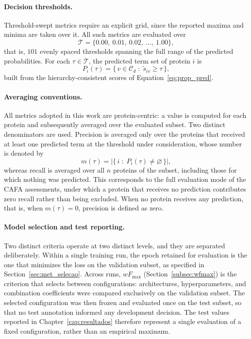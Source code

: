 \documentclass[Ingles]{ic-tese-v3}
\begin{document}
\paragraph{Decision thresholds.}
Threshold-swept metrics require an explicit grid, since the reported maxima and
minima are taken over it. All such metrics are evaluated over
\begin{equation}
\label{eq:limiares}
\mathcal{T} = \{0.00,\ 0.01,\ 0.02,\ \ldots,\ 1.00\},
\end{equation}
\noindent that is, $101$ evenly spaced thresholds spanning the full range of the predicted
probabilities. For each $\tau \in \mathcal{T}$, the predicted term set of protein
$i$ is
\begin{equation}
\label{eq:conjunto_predito}
P_i(\tau) = \bigl\{\, v \in \mathcal{C}_d \;:\; \tilde{s}_{iv} \geq \tau \,\bigr\},
\end{equation}
\noindent built from the hierarchy-consistent scores of Equation~\ref{eq:prop_pred}.

\paragraph{Averaging conventions.}
All metrics adopted in this work are protein-centric: a value is computed for
each protein and subsequently averaged over the evaluated subset. Two distinct
denominators are used. Precision is averaged only over the proteins that received
at least one predicted term at the threshold under consideration, whose number is
denoted by
\begin{equation}
\label{eq:m_tau}
m(\tau) = \bigl| \{\, i \;:\; P_i(\tau) \neq \varnothing \,\} \bigr|,
\end{equation}
\noindent whereas recall is averaged over all $n$ proteins of the subset, including those
for which nothing was predicted. This corresponds to the full evaluation mode of
the CAFA assessments, under which a protein that receives no prediction
contributes zero recall rather than being excluded. When no protein receives any
prediction, that is, when $m(\tau) = 0$, precision is defined as zero.

\paragraph{Model selection and test reporting.}
Two distinct criteria operate at two distinct levels, and they are separated
deliberately. Within a single training run, the epoch retained for evaluation is
the one that minimizes the loss on the validation subset, as specified in
Section~\ref{sec:met_selecao}. Across runs, $wF_{\max}$
(Section~\ref{subsec:wfmax}) is the criterion that selects between
configurations: architectures, hyperparameters, and combination coefficients were
compared exclusively on the validation subset. The selected configuration was then
frozen and evaluated once on the test subset, so that no test annotation informed
any development decision. The test values reported in
Chapter~\ref{cap:resultados} therefore represent a single evaluation of a fixed
configuration, rather than an empirical maximum.
\end{document}
